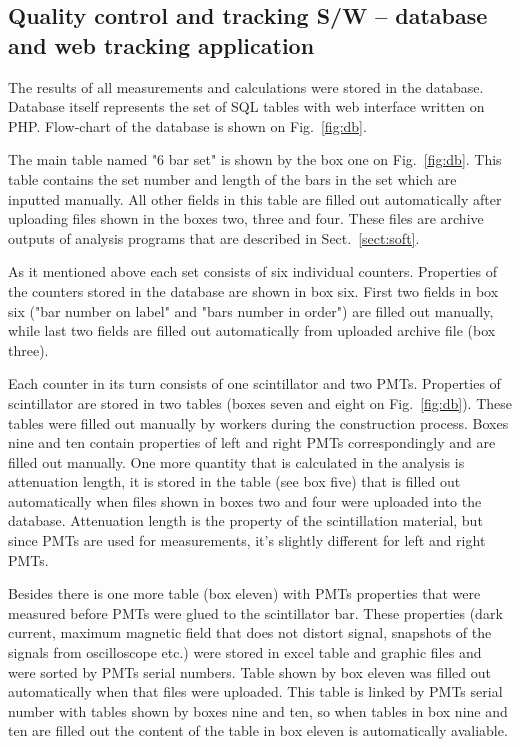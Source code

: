 \subsection{Quality control and tracking S/W -- database and web tracking application}
\label{sect:db}

The results of all measurements and calculations were stored in the database. Database itself represents the set of SQL tables with web interface written on PHP. Flow-chart of the database is shown on Fig.~\ref{fig:db}.

The main table named "6 bar set" is shown by the box one on Fig.~\ref{fig:db}. This table contains the set number and length of the bars in the set which are inputted manually. All other fields in this table are filled out automatically after uploading files shown in the boxes two, three and four. These files are archive outputs of analysis programs that are described in Sect.~\ref{sect:soft}.

As it mentioned above each set consists of six individual counters. Properties of the counters stored in the database are shown in box six. First two fields in box six ("bar number on label" and "bars number in order") are filled out manually, while last two fields are filled out automatically from uploaded archive file (box three).  

Each counter in its turn consists of one scintillator and two PMTs. Properties of scintillator are stored in two tables (boxes seven and eight on Fig.~\ref{fig:db}). These tables were filled out manually by workers during the construction process. Boxes nine and ten contain properties of left and right PMTs correspondingly and are filled out manually. One more quantity that is calculated in the analysis is attenuation length, it is stored in the table (see box five) that is filled out automatically when  files shown in boxes two and four were uploaded into the database. Attenuation length is the property of the scintillation material, but since PMTs are used for measurements, it's slightly different for left and right PMTs. 

Besides there is one more table (box eleven) with PMTs properties that were measured before PMTs were glued to the scintillator bar. These properties (dark current, maximum magnetic field that does not distort signal, snapshots of the signals from oscilloscope etc.) were stored in excel table and graphic files and were sorted by PMTs serial numbers. Table shown by box eleven was filled out automatically when that files were uploaded. This table is linked by PMTs serial number with tables shown by boxes nine and ten, so when tables in box nine and ten are filled out the content of the table in box eleven is automatically avaliable.

